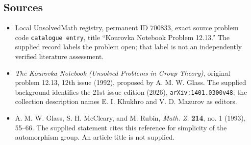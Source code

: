 \documentclass[11pt]{article}
\begin{document}
\subsection{Sources}
\begin{itemize}
\item Local UnsolvedMath registry, permanent ID $700833$, exact source problem code \texttt{catalogue entry}, title ``Kourovka Notebook Problem 12.13.'' The supplied record labels the problem open; that label is not an independently verified literature assessment.
\item \emph{The Kourovka Notebook (Unsolved Problems in Group Theory)}, original problem 12.13, 12th issue (1992), proposed by A. M. W. Glass. The supplied background identifies the 21st issue edition (2026), \texttt{arXiv:1401.0300v48}; the collection description names E. I. Khukhro and V. D. Mazurov as editors.
\item A. M. W. Glass, S. H. McCleary, and M. Rubin, \emph{Math. Z.} \textbf{214}, no. 1 (1993), 55--66. The supplied statement cites this reference for simplicity of the automorphism group. An article title is not supplied.
\end{itemize}
\end{document}
